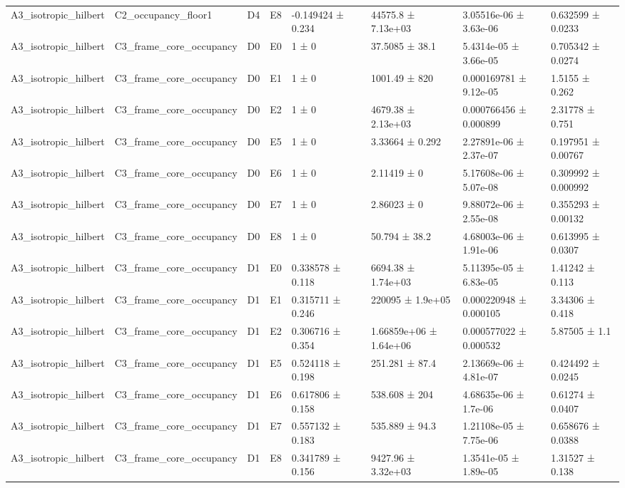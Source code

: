 \begin{table}
\begin{tabular}{lllllllll}
A3\_isotropic\_hilbert & C2\_occupancy\_floor1 & D4 & E8 & -0.149424 ± 0.234 &  & 44575.8 ± 7.13e+03 & 3.05516e-06 ± 3.63e-06 & 0.632599 ± 0.0233 \\
A3\_isotropic\_hilbert & C3\_frame\_core\_occupancy & D0 & E0 & 1 ± 0 &  & 37.5085 ± 38.1 & 5.4314e-05 ± 3.66e-05 & 0.705342 ± 0.0274 \\
A3\_isotropic\_hilbert & C3\_frame\_core\_occupancy & D0 & E1 & 1 ± 0 &  & 1001.49 ± 820 & 0.000169781 ± 9.12e-05 & 1.5155 ± 0.262 \\
A3\_isotropic\_hilbert & C3\_frame\_core\_occupancy & D0 & E2 & 1 ± 0 &  & 4679.38 ± 2.13e+03 & 0.000766456 ± 0.000899 & 2.31778 ± 0.751 \\
A3\_isotropic\_hilbert & C3\_frame\_core\_occupancy & D0 & E5 & 1 ± 0 &  & 3.33664 ± 0.292 & 2.27891e-06 ± 2.37e-07 & 0.197951 ± 0.00767 \\
A3\_isotropic\_hilbert & C3\_frame\_core\_occupancy & D0 & E6 & 1 ± 0 &  & 2.11419 ± 0 & 5.17608e-06 ± 5.07e-08 & 0.309992 ± 0.000992 \\
A3\_isotropic\_hilbert & C3\_frame\_core\_occupancy & D0 & E7 & 1 ± 0 &  & 2.86023 ± 0 & 9.88072e-06 ± 2.55e-08 & 0.355293 ± 0.00132 \\
A3\_isotropic\_hilbert & C3\_frame\_core\_occupancy & D0 & E8 & 1 ± 0 &  & 50.794 ± 38.2 & 4.68003e-06 ± 1.91e-06 & 0.613995 ± 0.0307 \\
A3\_isotropic\_hilbert & C3\_frame\_core\_occupancy & D1 & E0 & 0.338578 ± 0.118 &  & 6694.38 ± 1.74e+03 & 5.11395e-05 ± 6.83e-05 & 1.41242 ± 0.113 \\
A3\_isotropic\_hilbert & C3\_frame\_core\_occupancy & D1 & E1 & 0.315711 ± 0.246 &  & 220095 ± 1.9e+05 & 0.000220948 ± 0.000105 & 3.34306 ± 0.418 \\
A3\_isotropic\_hilbert & C3\_frame\_core\_occupancy & D1 & E2 & 0.306716 ± 0.354 &  & 1.66859e+06 ± 1.64e+06 & 0.000577022 ± 0.000532 & 5.87505 ± 1.1 \\
A3\_isotropic\_hilbert & C3\_frame\_core\_occupancy & D1 & E5 & 0.524118 ± 0.198 &  & 251.281 ± 87.4 & 2.13669e-06 ± 4.81e-07 & 0.424492 ± 0.0245 \\
A3\_isotropic\_hilbert & C3\_frame\_core\_occupancy & D1 & E6 & 0.617806 ± 0.158 &  & 538.608 ± 204 & 4.68635e-06 ± 1.7e-06 & 0.61274 ± 0.0407 \\
A3\_isotropic\_hilbert & C3\_frame\_core\_occupancy & D1 & E7 & 0.557132 ± 0.183 &  & 535.889 ± 94.3 & 1.21108e-05 ± 7.75e-06 & 0.658676 ± 0.0388 \\
A3\_isotropic\_hilbert & C3\_frame\_core\_occupancy & D1 & E8 & 0.341789 ± 0.156 &  & 9427.96 ± 3.32e+03 & 1.3541e-05 ± 1.89e-05 & 1.31527 ± 0.138 \\

\end{tabular}
\end{table}
